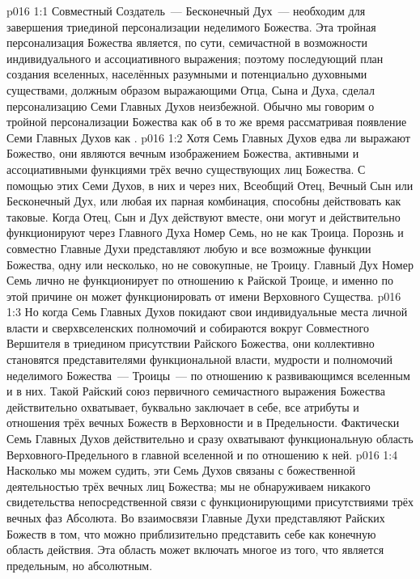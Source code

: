 \vs p016 1:1 Совместный Создатель~--- Бесконечный Дух~--- необходим для завершения триединой персонализации неделимого Божества. Эта тройная персонализация Божества является, по сути, семичастной в возможности индивидуального и ассоциативного выражения; поэтому последующий план создания вселенных, населённых разумными и потенциально духовными существами, должным образом выражающими Отца, Сына и Духа, сделал персонализацию Семи Главных Духов неизбежной. Обычно мы говорим о тройной персонализации Божества как об  в то же время рассматривая появление Семи Главных Духов как .
\vs p016 1:2 Хотя Семь Главных Духов едва ли выражают  Божество, они являются вечным изображением  Божества, активными и ассоциативными функциями трёх вечно существующих лиц Божества. С помощью этих Семи Духов, в них и через них, Всеобщий Отец, Вечный Сын или Бесконечный Дух, или любая их парная комбинация, способны действовать как таковые. Когда Отец, Сын и Дух действуют вместе, они могут и действительно функционируют через Главного Духа Номер Семь, но не как Троица. Порознь и совместно Главные Духи представляют любую и все возможные функции Божества, одну или несколько, но не совокупные, не Троицу. Главный Дух Номер Семь лично не функционирует по отношению к Райской Троице, и именно по этой причине он может функционировать  от имени Верховного Существа.
\vs p016 1:3 Но когда Семь Главных Духов покидают свои индивидуальные места личной власти и сверхвселенских полномочий и собираются вокруг Совместного Вершителя в триедином присутствии Райского Божества, они коллективно становятся представителями функциональной власти, мудрости и полномочий неделимого Божества~--- Троицы~--- по отношению к развивающимся вселенным и в них. Такой Райский союз первичного семичастного выражения Божества действительно охватывает, буквально заключает в себе, все атрибуты и отношения трёх вечных Божеств в Верховности и в Предельности. Фактически Семь Главных Духов действительно и сразу охватывают функциональную область Верховного\hyp{}Предельного в главной вселенной и по отношению к ней.
\vs p016 1:4 Насколько мы можем судить, эти Семь Духов связаны с божественной деятельностью трёх вечных лиц Божества; мы не обнаруживаем никакого свидетельства непосредственной связи с функционирующими присутствиями трёх вечных фаз Абсолюта. Во взаимосвязи Главные Духи представляют Райских Божеств в том, что можно приблизительно представить себе как конечную область действия. Эта область может включать многое из того, что является предельным, но  абсолютным.
